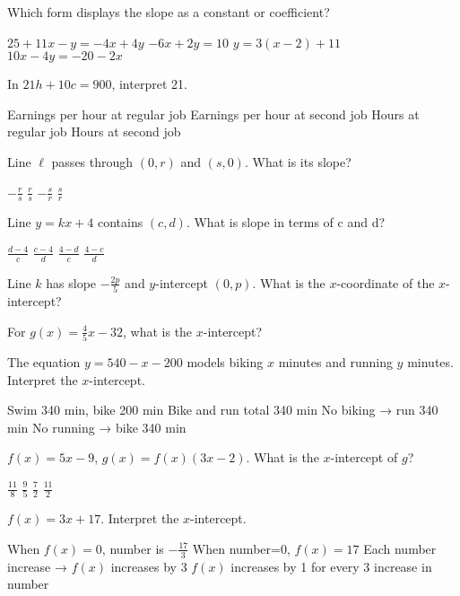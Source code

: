 \documentclass[12pt]{exam}
\begin{document}
\begin{questions}
\question Which form displays the slope as a constant or coefficient?
\begin{choices}
\choice $25 + 11x - y = -4x + 4y$
\choice $-6x + 2y = 10$
\choice $y = 3(x - 2) + 11$
\choice $10x - 4y = -20 - 2x$
\end{choices}

\question In $21h + 10c = 900$, interpret 21.
\begin{choices}
\choice Earnings per hour at regular job
\choice Earnings per hour at second job
\choice Hours at regular job
\choice Hours at second job
\end{choices}

\question Line $\ell$ passes through $(0,r)$ and $(s,0)$. What is its slope?
\begin{choices}
\choice $-\frac{r}{s}$
\choice $\frac{r}{s}$
\choice $-\frac{s}{r}$
\choice $\frac{s}{r}$
\end{choices}

\question Line $y = kx + 4$ contains $(c,d)$. What is slope in terms of c and d?
\begin{choices}
\choice $\frac{d - 4}{c}$
\choice $\frac{c - 4}{d}$
\choice $\frac{4 - d}{c}$
\choice $\frac{4 - c}{d}$
\end{choices}

\question Line $k$ has slope $-\frac{2p}{5}$ and $y$-intercept $(0,p)$. What is the $x$-coordinate of the $x$-intercept?

\question For $g(x) = \frac{4}{5}x - 32$, what is the $x$-intercept?

\question The equation $y = 540 - x - 200$ models biking $x$ minutes and running $y$ minutes. Interpret the $x$-intercept.
\begin{choices}
\choice Swim 340 min, bike 200 min
\choice Bike and run total 340 min
\choice No biking → run 340 min
\choice No running → bike 340 min
\end{choices}

\question $f(x) = 5x - 9$, $g(x) = f(x)(3x - 2)$. What is the $x$-intercept of $g$?
\begin{choices}
\choice $\frac{11}{8}$
\choice $\frac{9}{5}$
\choice $\frac{7}{2}$
\choice $\frac{11}{2}$
\end{choices}

\question $f(x) = 3x + 17$. Interpret the $x$-intercept.
\begin{choices}
\choice When $f(x)=0$, number is $-\frac{17}{3}$
\choice When number=0, $f(x)=17$
\choice Each number increase → $f(x)$ increases by 3
\choice $f(x)$ increases by 1 for every 3 increase in number
\end{choices}


\end{questions}
\end{document}
